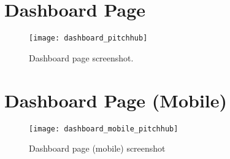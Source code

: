 \section{Dashboard Page}\label{A:dashboard_pitchhub}

\begin{sidewaysfigure}[ht]
    \centering
    \texttt{[image: dashboard\_pitchhub]}
    \caption{Dashboard page screenshot.}
\end{sidewaysfigure}

\section{Dashboard Page (Mobile)}\label{A:dashboard_mobile_pitchhub}

\begin{figure}[ht]
    \centering
    \texttt{[image: dashboard\_mobile\_pitchhub]}
    \caption{Dashboard page (mobile) screenshot}
\end{figure}

